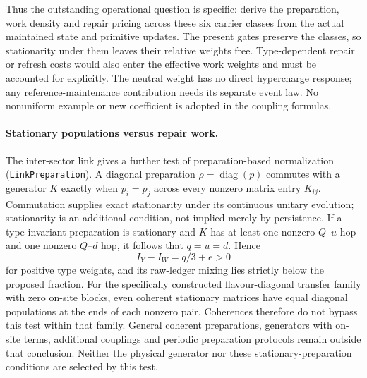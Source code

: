 Thus the outstanding operational question is specific: derive the preparation, work density and repair pricing across these six carrier classes from the actual maintained state and primitive updates. The present gates preserve the classes, so stationarity under them leaves their relative weights free. Type-dependent repair or refresh costs would also enter the effective work weights and must be accounted for explicitly. The neutral weight has no direct hypercharge response; any reference-maintenance contribution needs its separate event law. No nonuniform example or new coefficient is adopted in the coupling formulas.

\paragraph{Stationary populations versus repair work.} The inter-sector link gives a further test of preparation-based normalization (\texttt{LinkPreparation}). A diagonal preparation $\rho=\operatorname{diag}(p)$ commutes with a generator $K$ exactly when $p_i=p_j$ across every nonzero matrix entry $K_{ij}$. Commutation supplies exact stationarity under its continuous unitary evolution; stationarity is an additional condition, not implied merely by persistence. If a type-invariant preparation is stationary and $K$ has at least one nonzero $Q$--$u$ hop and one nonzero $Q$--$d$ hop, it follows that $q=u=d$. Hence
\begin{equation}
 I_Y-I_W=q/3+e>0
\end{equation}
for positive type weights, and its raw-ledger mixing lies strictly below the proposed fraction. For the specifically constructed flavour-diagonal transfer family with zero on-site blocks, even coherent stationary matrices have equal diagonal populations at the ends of each nonzero pair. Coherences therefore do not bypass this test within that family. General coherent preparations, generators with on-site terms, additional couplings and periodic preparation protocols remain outside that conclusion. Neither the physical generator nor these stationary-preparation conditions are selected by this test.

